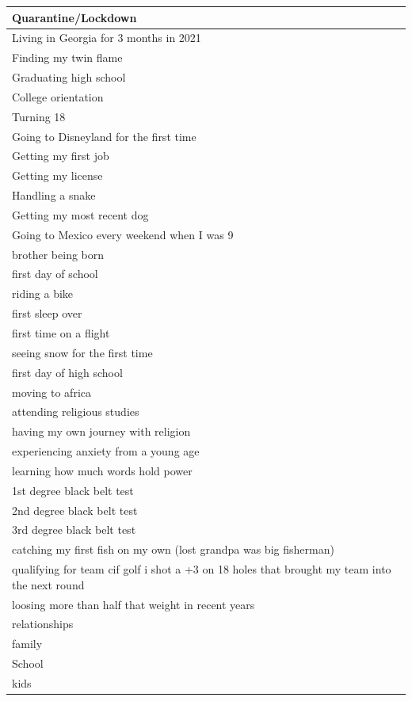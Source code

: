 \documentclass[
  .7em,
  letterpaper,
  DIV=11,
  numbers=noendperiod]{scrartcl}
\begin{document}
\begin{table}
\begin{tabular}{l}
\hline
Quarantine/Lockdown\\
\hline
Living in Georgia for 3 months in 2021\\
\hline
Finding my twin flame\\
\hline
Graduating high school\\
\hline
College orientation\\
\hline
Turning 18\\
\hline
Going to Disneyland for the first time\\
\hline
Getting my first job\\
\hline
Getting my license\\
\hline
Handling a snake\\
\hline
Getting my most recent dog\\
\hline
Going to Mexico every weekend when I was 9\\
\hline
brother being born\\
\hline
first day of school\\
\hline
riding a bike\\
\hline
first sleep over\\
\hline
first time on a flight\\
\hline
seeing snow for the first time\\
\hline
first day of high school\\
\hline
moving to africa\\
\hline
attending religious studies\\
\hline
having my own journey with religion\\
\hline
experiencing anxiety from a young age\\
\hline
learning how much words hold power\\
\hline
1st degree black belt test\\
\hline
2nd degree black belt test\\
\hline
3rd degree black belt test\\
\hline
catching my first fish on my own (lost grandpa was big fisherman)\\
\hline
qualifying for team cif golf i shot a +3 on 18 holes that brought my team into the next round\\
\hline
loosing more than half that weight in recent years\\
\hline
relationships\\
\hline
family\\
\hline
School\\
\hline
kids\\
\hline

\end{tabular}
\end{table}
\end{document}
